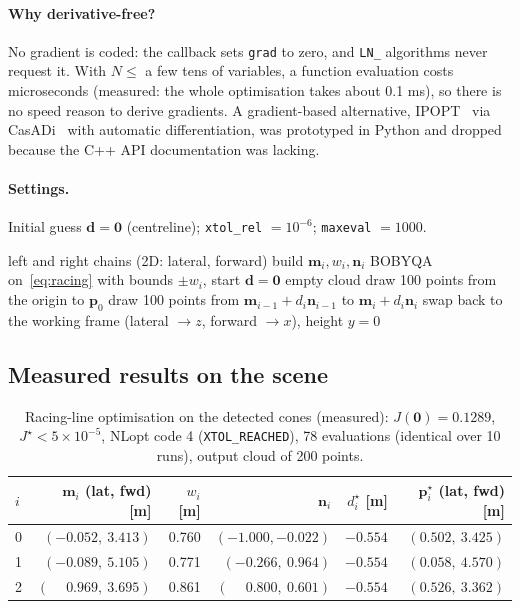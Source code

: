 \documentclass[10pt,a4paper]{scrartcl}
\newcommand{\code}[1]{\texttt{#1}}
\begin{document}
  \paragraph{Why derivative-free?} No gradient is coded: the callback sets
  \code{grad} to zero, and \code{LN\_} algorithms never request it. With
  $N\le$ a few tens of variables, a function evaluation costs microseconds (measured: the
  whole optimisation takes about 0.1 ms), so there is no speed reason to derive
  gradients. A gradient-based alternative, IPOPT~\citep{wachter2006ipopt} via
  CasADi~\citep{andersson2019casadi} with automatic differentiation, was prototyped in
  Python and dropped because the C++ API documentation was lacking.

  \paragraph{Settings.} Initial guess $\bm d=\bm 0$ (centreline); \code{xtol\_rel}
  $=10^{-6}$; \code{maxeval} $=1000$.

  \begin{algorithm}[H]
  \caption{Racing line (\code{get\_racing\_line\_point\_cloud})}\label{alg:racing}
  \begin{algorithmic}[1]
  \Require left and right chains (2D: lateral, forward)
  \State build $\bm m_i,w_i,\bm n_i$ \Comment{\code{TrackData} constructor}
  \State BOBYQA on~\eqref{eq:racing} with bounds $\pm w_i$, start $\bm d=\bm 0$
   \Return empty cloud \EndIf
  \State draw 100 points from the origin to $\bm p_0$
   draw 100 points from $\bm m_{i-1}+d_i\bm n_{i-1}$ to $\bm m_i+d_i\bm n_i$ \EndFor
  \State swap back to the working frame (lateral $\to z$, forward $\to x$), height $y=0$
  \end{algorithmic}
  \end{algorithm}

  \subsection{Measured results on the scene}

  \begin{table}[H]
  \small
  \centering
  \renewcommand{\arraystretch}{1.05}
  \begin{tabular}{@{}lrrrrr@{}}
  \toprule
  $i$ & $\bm m_i$ (lat, fwd) [m] & $w_i$ [m] & $\bm n_i$ & $d_i^\star$ [m] & $\bm p_i^\star$ (lat, fwd) [m] \\
  \midrule
  0 & $(-0.052,\ 3.413)$ & 0.760 & $(-1.000,-0.022)$ & $-0.554$ & $(0.502,\ 3.425)$ \\
  1 & $(-0.089,\ 5.105)$ & 0.771 & $(-0.266,\ 0.964)$ & $-0.554$ & $(0.058,\ 4.570)$ \\
  2 & $(\phantom{-}0.969,\ 3.695)$ & 0.861 & $(\phantom{-}0.800,\ 0.601)$ & $-0.554$ & $(0.526,\ 3.362)$ \\
  \bottomrule
  \end{tabular}
  \caption{Racing-line optimisation on the detected cones (measured):
  $J(\bm 0)=0.1289$, $J^\star<5\times10^{-5}$, NLopt code 4 (\code{XTOL\_REACHED}),
  78 evaluations (identical over 10 runs), output cloud of 200 points.}
  \label{tab:racing}
  \end{table}
\end{document}
